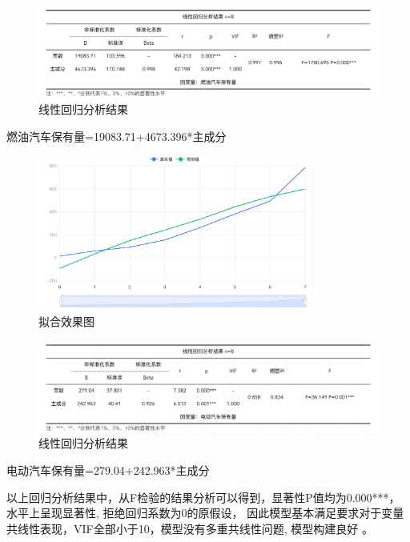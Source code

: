 \documentclass[12pt, a4paper, oneside]{ctexart}
\begin{document}
\begin{figure}[H]
  \centering
  \includegraphics[width=\textwidth]{pic/截屏2022-05-19 下午5.30.59.png}
  \caption{线性回归分析结果}
  \label{fig:线性回归分析结果}
\end{figure}

燃油汽车保有量=19083.71+4673.396*主成分

\begin{figure}[H]
  \centering
  \includegraphics[width=0.8\textwidth]{pic/拟合效果图.jpg}
  \caption{拟合效果图}
  \label{fig:拟合效果图2}
\end{figure}

\begin{figure}[H]
  \centering
  \includegraphics[width=\textwidth]{pic/截屏2022-05-19 下午5.29.26.png}
  \caption{线性回归分析结果}
  \label{fig:线性回归分析结果2}
\end{figure}

电动汽车保有量=279.04+242.963*主成分

以上回归分析结果中，从F检验的结果分析可以得到，显著性P值均为0.000***，水平上呈现显著性,
拒绝回归系数为0的原假设，
因此模型基本满足要求对于变量共线性表现，VIF全部小于10，模型没有多重共线性问题,
模型构建良好 。
\end{document}
